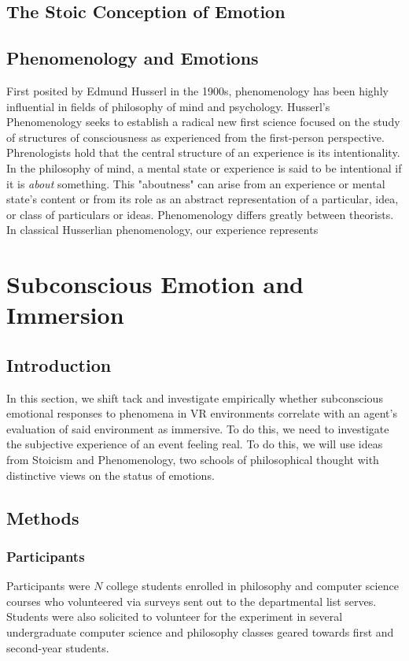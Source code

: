 \subsection{The Stoic Conception of Emotion }

\subsection{Phenomenology and Emotions}
First posited by Edmund Husserl in the 1900s, phenomenology has been highly influential in fields of philosophy of mind and psychology. Husserl's Phenomenology seeks to establish a radical new first science focused on the study of structures of consciousness as experienced from the first-person perspective. Phrenologists hold that the central structure of an experience is its intentionality. In the philosophy of mind, a mental state or experience is said to be intentional if it is \textit{about} something. This "aboutness" can arise from an experience or mental state's content or from its role as an abstract representation of a particular, idea, or class of particulars or ideas.  Phenomenology differs greatly between theorists. In classical Husserlian phenomenology, our experience represents  
\section{Subconscious Emotion and Immersion}
\subsection{Introduction}
In this section, we shift tack and investigate empirically whether subconscious emotional responses to phenomena in VR environments correlate with an agent's evaluation of said environment as immersive. To do this, we need to investigate the subjective experience of an event feeling real.  To do this, we will use ideas from Stoicism and Phenomenology, two schools of philosophical thought with distinctive views on the status of emotions. 
\subsection{Methods}
\subsubsection{Participants}
Participants were $N$ college students enrolled in philosophy and computer science courses who volunteered via surveys sent out to the departmental list serves. Students were also solicited to volunteer for the experiment in several undergraduate computer science and philosophy classes geared towards first and second-year students.
